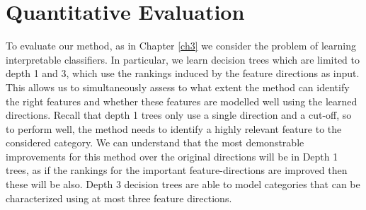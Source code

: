 











\section{Quantitative Evaluation}\label{secExperiments}

To evaluate our method, as in Chapter \ref{ch3} we consider the problem of learning interpretable classifiers. In particular, we learn decision trees which are limited to depth 1 and 3, which use the rankings induced by the feature directions as input. This allows us to simultaneously assess to what extent the method can identify the right features and whether these features are modelled well using the learned directions. Recall that depth 1 trees only use a single direction and a cut-off, so to perform well, the method needs to identify a highly relevant feature to the considered category. We can understand that the most demonstrable improvements for this method over the original directions will be in Depth 1 trees, as if the rankings for the important feature-directions are improved then these will be also. Depth 3 decision trees are able to model categories that can be characterized using at most three feature directions.


